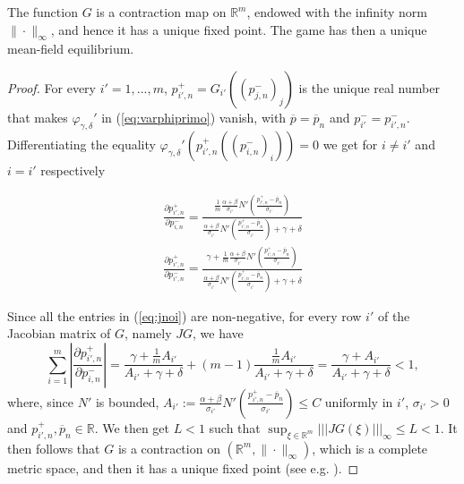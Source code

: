 \documentclass[graybox]{svmult}
\begin{document}
\begin{proposition}
\label{prop:contraction}
The function $G$ is  a contraction map on $\mathbb{R}^m$, endowed with the infinity norm $\|\cdot\|_\infty$, and hence it has a unique fixed point. The game has then a unique mean-field equilibrium.
\end{proposition}

\begin{proof}
For every $i'=1,...,m$, $p_{i',n}^+=G_{i'}((p_{j,n}^-)_j)$ is the unique real number that makes $\varphi_{\gamma,\delta}'$ in (\ref{eq:varphiprimo}) vanish, with $\overline p=\overline p_n$ and $p_{i'}^-=p_{i',n}^-$. Differentiating the equality $\varphi_{\gamma,\delta}'(p_{i',n}^+((p_{i,n}^-)_i))=0$ we get for $i\neq i'$ and $i=i'$ respectively

\begin{equation}
\label{eq:jnoi}
\begin{array}{l}
\displaystyle
\frac{\partial p_{i',n}^+}{\partial p_{i,n}^-}=
\frac{\frac{1}{m}
\frac{\alpha+\beta}{\sigma_{i'}}N'\left(\frac{p_{i',n}^+-\overline p_n}{\sigma_{i'}}\right)}
{\frac{\alpha+\beta}{\sigma_{i'}}N'\left(\frac{p_{i',n}^+-\overline p_n}{\sigma_{i'}}\right)+\gamma+\delta}
\\
\displaystyle
\frac{\partial p_{i',n}^+}{\partial p_{i',n}^-}=
\frac{\gamma+\frac{1}{m}
\frac{\alpha+\beta}{\sigma_{i'}}N'\left(\frac{p_{i',n}^+-\overline p_n}{\sigma_{i'}}\right)}
{\frac{\alpha+\beta}{\sigma_{i'}}N'\left(\frac{p_{i',n}^+-\overline p_n}{\sigma_{i'}}\right)+\gamma+\delta}
\end{array}
\end{equation}

\noindent
Since all the entries in (\ref{eq:jnoi}) are non-negative, for every row $i'$ of the Jacobian matrix of $G$, namely $JG$, we have
\[
\sum_{i=1}^m\left|\frac{\partial p_{i',n}^+}{\partial p_{i,n}^-}\right|
=\frac{\gamma+\frac1m A_{i'}}{A_{i'}+\gamma+\delta}
+(m-1)\frac{\frac1m A_{i'}}{A_{i'}+\gamma+\delta}
=\frac{\gamma+A_{i'}}{A_{i'}+\gamma+\delta}<1,
\]
where, since $N'$ is bounded, $\displaystyle A_{i'}:=\frac{\alpha+\beta}{\sigma_{i'}}N'\left(\frac{p_{i',n}^+-\overline p_n}{\sigma_{i'}}\right)\leq C$ uniformly in $i'$, $\sigma_{i'}>0$ and  $p_{i',n}^+,\overline p_n\in\mathbb{R}$. We then get $L<1$ such that $\displaystyle \sup_{\xi\in\mathbb{R}^m}\vert\!\vert\!\vert JG(\xi)\vert\!\vert\!\vert_\infty\le L<1$. It then follows that $G$ is a contraction on $(\mathbb{R}^m,\|\cdot\|_\infty)$, which is a complete metric space, and then it has a unique fixed point (see e.g. \cite{ortrhe}).
\end{proof}
\end{document}
